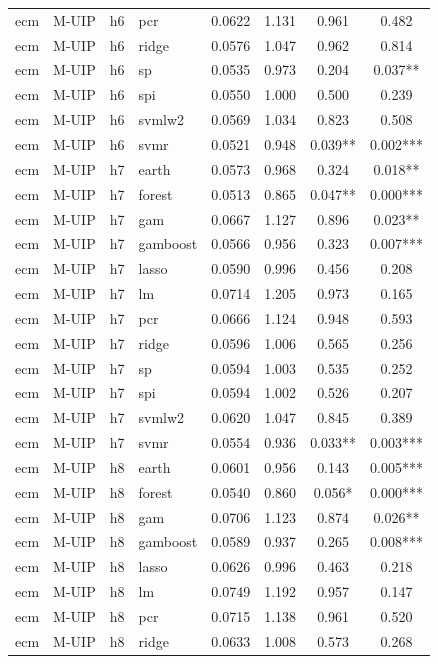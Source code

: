 \begin{ThreePartTable}
\begin{longtable}[t]{llclcccc}
ecm & M-UIP & h6 & pcr & 0.0622 & 1.131 & 0.961 & 0.482\\
ecm & M-UIP & h6 & ridge & 0.0576 & 1.047 & 0.962 & 0.814\\
ecm & M-UIP & h6 & sp & 0.0535 & 0.973 & 0.204 & 0.037**\\
ecm & M-UIP & h6 & spi & 0.0550 & 1.000 & 0.500 & 0.239\\
ecm & M-UIP & h6 & svmlw2 & 0.0569 & 1.034 & 0.823 & 0.508\\
ecm & M-UIP & h6 & svmr & 0.0521 & 0.948 & 0.039** & 0.002***\\
\addlinespace
ecm & M-UIP & h7 & earth & 0.0573 & 0.968 & 0.324 & 0.018**\\
ecm & M-UIP & h7 & forest & 0.0513 & 0.865 & 0.047** & 0.000***\\
ecm & M-UIP & h7 & gam & 0.0667 & 1.127 & 0.896 & 0.023**\\
ecm & M-UIP & h7 & gamboost & 0.0566 & 0.956 & 0.323 & 0.007***\\
ecm & M-UIP & h7 & lasso & 0.0590 & 0.996 & 0.456 & 0.208\\
ecm & M-UIP & h7 & lm & 0.0714 & 1.205 & 0.973 & 0.165\\
ecm & M-UIP & h7 & pcr & 0.0666 & 1.124 & 0.948 & 0.593\\
ecm & M-UIP & h7 & ridge & 0.0596 & 1.006 & 0.565 & 0.256\\
ecm & M-UIP & h7 & sp & 0.0594 & 1.003 & 0.535 & 0.252\\
ecm & M-UIP & h7 & spi & 0.0594 & 1.002 & 0.526 & 0.207\\
ecm & M-UIP & h7 & svmlw2 & 0.0620 & 1.047 & 0.845 & 0.389\\
ecm & M-UIP & h7 & svmr & 0.0554 & 0.936 & 0.033** & 0.003***\\
\addlinespace
ecm & M-UIP & h8 & earth & 0.0601 & 0.956 & 0.143 & 0.005***\\
ecm & M-UIP & h8 & forest & 0.0540 & 0.860 & 0.056* & 0.000***\\
ecm & M-UIP & h8 & gam & 0.0706 & 1.123 & 0.874 & 0.026**\\
ecm & M-UIP & h8 & gamboost & 0.0589 & 0.937 & 0.265 & 0.008***\\
ecm & M-UIP & h8 & lasso & 0.0626 & 0.996 & 0.463 & 0.218\\
ecm & M-UIP & h8 & lm & 0.0749 & 1.192 & 0.957 & 0.147\\
ecm & M-UIP & h8 & pcr & 0.0715 & 1.138 & 0.961 & 0.520\\
ecm & M-UIP & h8 & ridge & 0.0633 & 1.008 & 0.573 & 0.268\\

\end{longtable}
\end{ThreePartTable}
